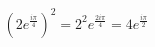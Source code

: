 \documentclass[preview]{standalone}
\begin{document}
\begin{align*}
(2e^{\frac{i\pi}{4}})^2 = 2^2 e^{\frac{2i\pi}{4}} = 4e^{\frac{i\pi}{2}}
\end{align*}
\end{document}
